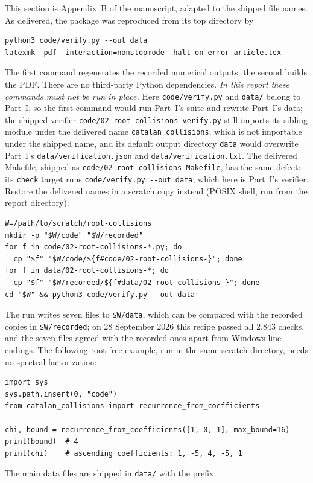 \documentclass[11pt,a4paper]{article}
\numberwithin{equation}{section}
\theoremstyle{definition}
\theoremstyle{remark}
\begin{document}
This section is Appendix~B of the manuscript, adapted to the shipped file
names.  As delivered, the package was reproduced from its top directory by
\begin{lstlisting}
python3 code/verify.py --out data
latexmk -pdf -interaction=nonstopmode -halt-on-error article.tex
\end{lstlisting}
The first command regenerates the recorded numerical outputs; the second
builds the PDF.  There are no third-party Python dependencies.
\emph{In this report these commands must not be run in place.}  Here
\nolinkurl{code/verify.py} and \nolinkurl{data/} belong to Part~I, so the
first command would run Part~I's suite and rewrite Part~I's data; the
shipped verifier \nolinkurl{code/02-root-collisions-verify.py} still
imports its sibling module under the delivered name
\texttt{catalan\_collisions}, which is not importable under the shipped
name, and its default output directory \nolinkurl{data} would overwrite
Part~I's \nolinkurl{data/verification.json} and
\nolinkurl{data/verification.txt}.  The delivered Makefile, shipped as
\nolinkurl{code/02-root-collisions-Makefile}, has the same defect: its
\texttt{check} target runs \nolinkurl{code/verify.py --out data}, which
here is Part~I's verifier.
Restore the delivered names in a scratch copy instead (POSIX shell, run
from the report directory):
\begin{lstlisting}
W=/path/to/scratch/root-collisions
mkdir -p "$W/code" "$W/recorded"
for f in code/02-root-collisions-*.py; do
  cp "$f" "$W/code/${f#code/02-root-collisions-}"; done
for f in data/02-root-collisions-*; do
  cp "$f" "$W/recorded/${f#data/02-root-collisions-}"; done
cd "$W" && python3 code/verify.py --out data
\end{lstlisting}
The run writes seven files to \texttt{\$W/data}, which can be compared
with the recorded copies in \texttt{\$W/recorded}; on 28 September 2026
this recipe passed all 2,843 checks, and the seven files agreed with the
recorded ones apart from Windows line endings.  The following
root-free example, run in the same scratch directory, needs no spectral
factorization:
\begin{lstlisting}
import sys
sys.path.insert(0, "code")
from catalan_collisions import recurrence_from_coefficients

chi, bound = recurrence_from_coefficients([1, 0, 1], max_bound=16)
print(bound)  # 4
print(chi)    # ascending coefficients: 1, -5, 4, -5, 1
\end{lstlisting}
The main data files are shipped in \nolinkurl{data/} with the prefix
\end{document}
